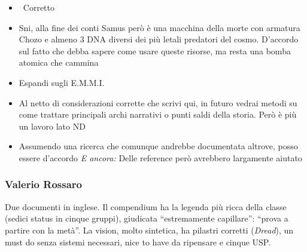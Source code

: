 {\begin{itemize}
  \item {} \rvBene\ Corretto
  \item {} Sni, alla fine dei conti Samus però è una macchina della morte con armatura Chozo e almeno 3 DNA diversi dei più letali predatori del cosmo. D'accordo sul fatto che debba sapere come usare queste risorse, ma resta una bomba atomica che cammina
  \item {} Espandi sugli E.M.M.I.
  \item {} Al netto di considerazioni corrette che scrivi qui, in futuro vedrai metodi su come trattare principali archi narrativi o punti saldi della storia. Però è più un lavoro lato ND
  \item {} Assumendo una ricerca che comunque andrebbe documentata altrove, posso essere d'accordo \emph{E ancora:} Delle reference però avrebbero largamente aiutato
\end{itemize}
}

\subsubsection{Valerio Rossaro}
Due documenti in inglese. Il compendium ha la legenda più ricca della classe (sedici status in cinque gruppi), giudicata ``estremamente capillare'': ``prova a partire con la metà''. La vision, molto sintetica, ha pilastri corretti (\emph{Dread}), un must do senza sistemi necessari, nice to have da ripensare e cinque USP.
